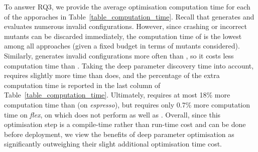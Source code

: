 To answer RQ3, we provide the average optimisation computation time for each of the apporaches in Table~\ref{table_computation_time}. Recall that \dr{} generates and evaluates numerous invalid configurations. However, since crashing or incorrect mutants can be discarded immediately, the computation time of \dr{} is the lowest among all approaches (given a fixed budget in terms of mutants considered). Similarly, \dn{} generates invalid configurations more often than \sn{}, so it costs less computation time than \sn{}. Taking the deep parameter discovery time into account, \dn{} requires slightly more time than \sn{} does, and the percentage of the extra computation time is reported in the last column of Table~\ref{table_computation_time}. Ultimately, \dn{} requires at most 18\% more computation time than \sn{} (on \emph{espresso}), but requires only 0.7\% more computation time on \emph{flex}, on which \dn{} does not perform as well as \sn{}. Overall, since this optimisation step is a compile-time rather than run-time cost and can be done before deployment, we view the benefits of deep parameter optimisation as significantly outweighing their slight additional optimisation time cost.

